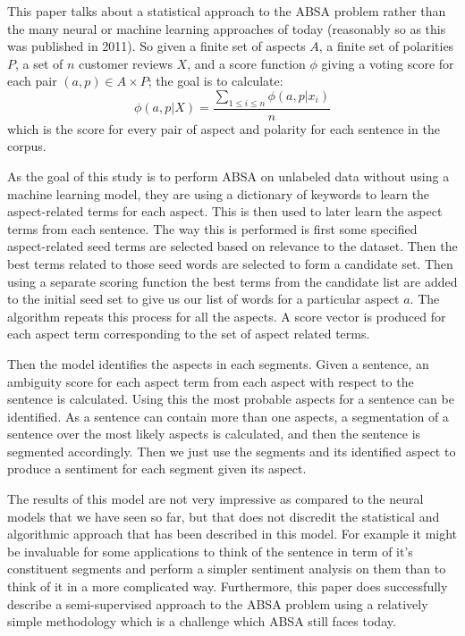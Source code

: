 \documentclass[conference]{IEEEtran}
\begin{document}
This paper talks about a statistical approach to the ABSA problem rather than the many neural or machine learning approaches of today (reasonably so as this was published in 2011). So given a finite set of aspects $A$, a finite set of polarities $P$, a set of $n$ customer reviews $X$, and a score function $\phi$ giving a voting score for each pair $(a,p) \in A \times P$; the goal is to calculate:
\begin{equation*}
  \phi (a,p|X) = \frac{\sum_{1 \leq i \leq n} \phi (a,p|x_i)}{n}
\end{equation*}
which is the score for every pair of aspect and polarity for each sentence in the corpus.

As the goal of this study is to perform ABSA on unlabeled data without using a machine learning model, they are using a dictionary of keywords to learn the aspect-related terms for each aspect. This is then used to later learn the aspect terms from each sentence. The way this is performed is first some specified aspect-related seed terms are selected based on relevance to the dataset. Then the best terms related to those seed words are selected to form a candidate set. Then using a separate scoring function the best terms from the candidate list are added to the initial seed set to give us our list of words for a particular aspect $a$. The algorithm repeats this process for all the aspects. A score vector is produced for each aspect term corresponding to the set of aspect related terms.

Then the model identifies the aspects in each segments. Given a sentence, an ambiguity score for each aspect term from each aspect with respect to the sentence is calculated. Using this the most probable aspects for a sentence can be identified. As a sentence can contain more than one aspects, a segmentation of a sentence over the most likely aspects is calculated, and then the sentence is segmented accordingly. Then we just use the segments and its identified aspect to produce a sentiment for each segment given its aspect.

The results of this model are not very impressive as compared to the neural models that we have seen so far, but that does not discredit the statistical and algorithmic approach that has been described in this model. For example it might be invaluable for some applications to think of the sentence in term of it's constituent segments and perform a simpler sentiment analysis on them than to think of it in a more complicated way. Furthermore, this paper does successfully describe a semi-supervised approach to the ABSA problem using a relatively simple methodology which is a challenge which ABSA still faces today.\\
\end{document}
